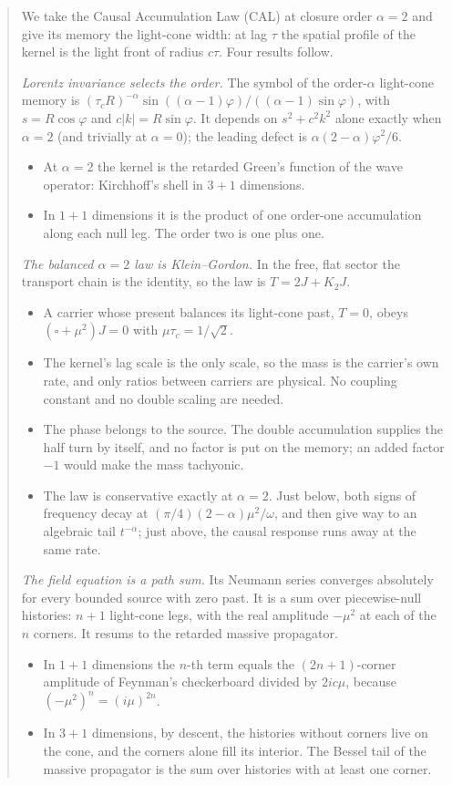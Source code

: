\documentclass[11pt]{amsart}
\theoremstyle{definition}
\theoremstyle{remark}
\begin{document}
\begin{abstract}
We take the Causal Accumulation Law (CAL) at closure order $\alpha=2$ and give its memory the light-cone width: at lag $\tau$ the spatial profile of the kernel is the light front of radius $c\tau$. Four results follow.

\emph{Lorentz invariance selects the order.} The symbol of the order-$\alpha$ light-cone memory is $(\tau_cR)^{-\alpha}\sin((\alpha-1)\varphi)/((\alpha-1)\sin\varphi)$, with $s=R\cos\varphi$ and $c\lvert k\rvert=R\sin\varphi$. It depends on $s^2+c^2k^2$ alone exactly when $\alpha=2$ (and trivially at $\alpha=0$); the leading defect is $\alpha(2-\alpha)\varphi^2/6$.
\begin{itemize}
\item At $\alpha=2$ the kernel is the retarded Green's function of the wave operator: Kirchhoff's shell in $3+1$ dimensions.
\item In $1+1$ dimensions it is the product of one order-one accumulation along each null leg. The order two is one plus one.
\end{itemize}

\emph{The balanced $\alpha=2$ law is Klein--Gordon.} In the free, flat sector the transport chain is the identity, so the law is $T=2J+K_2J$.
\begin{itemize}
\item A carrier whose present balances its light-cone past, $T=0$, obeys $(\square+\mu^2)J=0$ with $\mu\tau_c=1/\sqrt2$.
\item The kernel's lag scale is the only scale, so the mass is the carrier's own rate, and only ratios between carriers are physical. No coupling constant and no double scaling are needed.
\item The phase belongs to the source. The double accumulation supplies the half turn by itself, and no factor is put on the memory; an added factor $-1$ would make the mass tachyonic.
\item The law is conservative exactly at $\alpha=2$. Just below, both signs of frequency decay at $(\pi/4)(2-\alpha)\mu^2/\omega$, and then give way to an algebraic tail $t^{-\alpha}$; just above, the causal response runs away at the same rate.
\end{itemize}

\emph{The field equation is a path sum.} Its Neumann series converges absolutely for every bounded source with zero past. It is a sum over piecewise-null histories: $n+1$ light-cone legs, with the real amplitude $-\mu^2$ at each of the $n$ corners. It resums to the retarded massive propagator.
\begin{itemize}
\item In $1+1$ dimensions the $n$-th term equals the $(2n+1)$-corner amplitude of Feynman's checkerboard divided by $2ic\mu$, because $(-\mu^2)^n=(i\mu)^{2n}$.
\item In $3+1$ dimensions, by descent, the histories without corners live on the cone, and the corners alone fill its interior. The Bessel tail of the massive propagator is the sum over histories with at least one corner.
\end{itemize}


\end{abstract}
\end{document}
